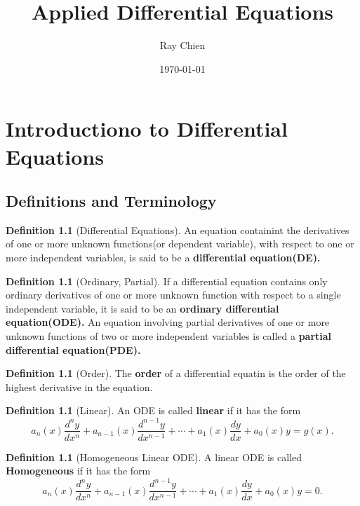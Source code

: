 \documentclass[12pt,a4paper]{report}
\title{Applied Differential Equations}
\author{Ray Chien}
\date{\today}
\theoremstyle{definition}
\newtheorem{definition}[theorem]{Definition}
\theoremstyle{remark}
\begin{document}
\maketitle
\tableofcontents

\chapter{Introductiono to Differential Equations}

\section{Definitions and Terminology}

\begin{definition}[Differential Equations]
    An equation containint the derivatives of one or more unknown functions(or dependent variable), with respect to one or more independent variables, is said to be a \textbf{differential equation(DE).}
\end{definition}

\begin{definition}[Ordinary, Partial]
    If a differential equation contains only ordinary derivatives of one or more unknown function with respect to a single independent variable, it is said to be an \textbf{ordinary differential equation(ODE).} An equation involving partial derivatives of one or more unknown functions of two or more independent variables is called a \textbf{partial differential equation(PDE).}
\end{definition}

\begin{definition}[Order]
    The \textbf{order} of a differential equatin is the order of the highest derivative in the equation.
\end{definition}

\begin{definition}[Linear]
    An ODE is called \textbf{linear} if it has the form 
    \[a_n(x)\frac{d^n y}{dx^n} + a_{n-1}(x)\frac{d^{n-1} y}{dx^{n-1}} + \cdots + a_1(x)\frac{dy}{dx} + a_0(x)y = g(x).\]
\end{definition}

\begin{definition}[Homogeneous Linear ODE]
    A linear ODE is called \textbf{Homogeneous} if it has the form 
    \[a_n(x)\frac{d^n y}{dx^n} + a_{n-1}(x)\frac{d^{n-1} y}{dx^{n-1}} + \cdots + a_1(x)\frac{dy}{dx} + a_0(x)y = 0.\]    
\end{definition}
\end{document}
